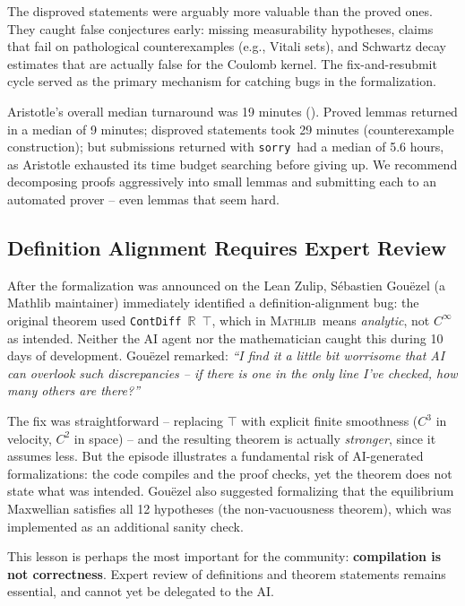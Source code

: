 \documentclass[11pt]{article}
\newcommand{\mathlib}{\textsc{Mathlib}}
\newcommand{\sorry}{\texttt{sorry}}
\newcommand{\RR}{\mathbb{R}}
\begin{document}
The disproved statements were arguably more valuable than the proved ones. They caught false conjectures early: missing measurability hypotheses, claims that fail on pathological counterexamples (e.g., Vitali sets), and Schwartz decay estimates that are actually false for the Coulomb kernel. The fix-and-resubmit cycle served as the primary mechanism for catching bugs in the formalization.

Aristotle's overall median turnaround was 19 minutes (). Proved lemmas returned in a median of 9 minutes; disproved statements took 29 minutes (counterexample construction); but submissions returned with \sorry\ had a median of 5.6 hours, as Aristotle exhausted its time budget searching before giving up. We recommend decomposing proofs aggressively into small lemmas and submitting each to an automated prover -- even lemmas that seem hard.

\subsection{Definition Alignment Requires Expert Review}

After the formalization was announced on the Lean Zulip, S\'ebastien Gou\"ezel (a Mathlib maintainer) immediately identified a definition-alignment bug: the original theorem used \texttt{ContDiff $\RR$ $\top$}, which in \mathlib\ means \emph{analytic}, not $C^\infty$ as intended. Neither the AI agent nor the mathematician caught this during 10 days of development. Gou\"ezel remarked: \emph{``I find it a little bit worrisome that AI can overlook such discrepancies -- if there is one in the only line I've checked, how many others are there?''}

The fix was straightforward -- replacing $\top$ with explicit finite smoothness ($C^3$ in velocity, $C^2$ in space) -- and the resulting theorem is actually \emph{stronger}, since it assumes less. But the episode illustrates a fundamental risk of AI-generated formalizations: the code compiles and the proof checks, yet the theorem does not state what was intended. Gou\"ezel also suggested formalizing that the equilibrium Maxwellian satisfies all 12 hypotheses (the non-vacuousness theorem), which was implemented as an additional sanity check.

This lesson is perhaps the most important for the community: \textbf{compilation is not correctness}. Expert review of definitions and theorem statements remains essential, and cannot yet be delegated to the AI.
\end{document}
